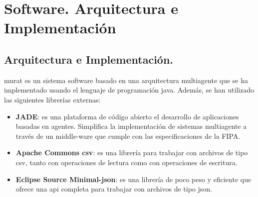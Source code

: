 \chapter{Software. Arquitectura e Implementación}
    \label{chap:five}
    
\section{Arquitectura e Implementación.}
\acrshort{murat} es un sistema software basado en una arquitectura multiagente que se ha implementado usando el lenguaje de programación \Gls{java}. Además, se han utilizado las siguientes librerías externas:
\begin{itemize}
    \item \textbf{JADE}: es una plataforma de código abierto el desarrollo de aplicaciones basadas en agentes. Simplifica la implementación de sistemas multiagente a través de un middle-ware que cumple con las especificaciones de la FIPA. \cite{jade}
    \item \textbf{Apache Commons \acrshort{csv}}: es una librería para trabajar con archivos de tipo \acrshort{csv}, tanto con operaciones de lectura como con operaciones de escritura.
    \item \textbf{Eclipse Source Minimal-\acrshort{json}}: es una librería de poco peso y eficiente que ofrece una \acrshort{api} completa para trabajar con archivos de tipo \acrshort{json}. 
\end{itemize}

